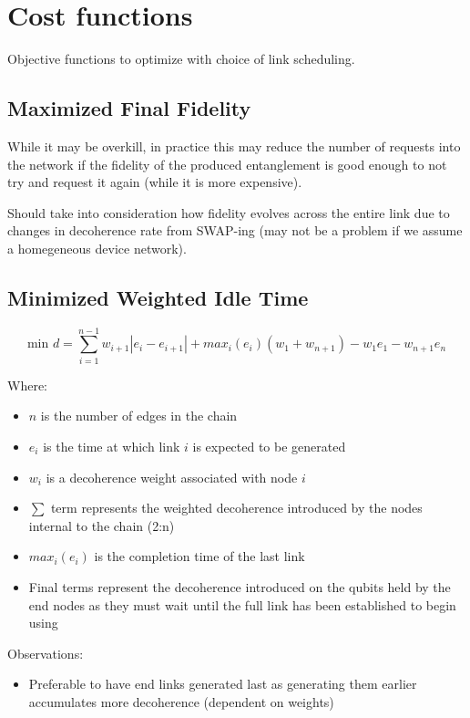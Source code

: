 \documentclass{article}
\begin{document}
\section{Cost functions}
Objective functions to optimize with choice of link scheduling.

\subsection{Maximized Final Fidelity}
While it may be overkill, in practice this may reduce the number of requests into the network if the fidelity of the produced entanglement is good enough to not try and request it again (while it is more expensive).

Should take into consideration how fidelity evolves across the entire link due to changes in decoherence rate from SWAP-ing (may not be a problem if we assume a homegeneous device network).

\subsection{Minimized Weighted Idle Time}

    $$\text{min } d = \sum_{i=1}^{n-1} w_{i+1}|e_i - e_{i+1}| + max_i(e_i)(w_1 + w_{n+1}) - w_1e_1 - w_{n+1}e_n$$

Where:
\begin{itemize}
    \item $n$ is the number of edges in the chain
    \item $e_i$ is the time at which link $i$ is expected to be generated
    \item $w_i$ is a decoherence weight associated with node $i$
    \item $\sum$ term represents the weighted decoherence introduced by the nodes internal to the chain (2:n)
    \item $max_i(e_i)$ is the completion time of the last link
    \item Final terms represent the decoherence introduced on the qubits held by the end nodes as they must wait until the full link has been established to begin using
\end{itemize}

Observations:
\begin{itemize}
    \item Preferable to have end links generated last as generating them earlier accumulates more decoherence (dependent on weights)
\end{itemize}
\end{document}
